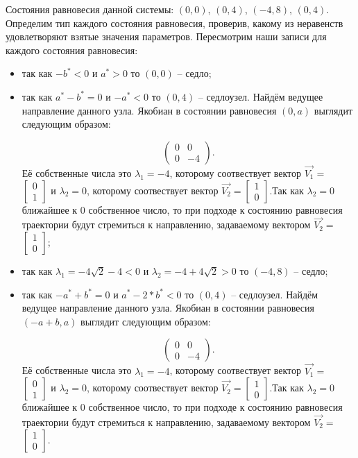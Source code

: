 Состояния равновесия данной системы: $(0, 0)$, $(0, 4)$, $(-4, 8)$, $(0, 4)$. Определим тип каждого состояния равновесия, проверив, какому из неравенств удовлетворяют взятые значения параметров.  Пересмотрим наши записи для каждого состояния равновесия: 
\begin{itemize}
	\item{ так как $-b^\ast  < 0 $ и $a^\ast > 0 $ то $(0, 0)$ -- седло;}
	\item{ так как $a^\ast - b^\ast = 0 $ и $-a^\ast  < 0 $ то $(0, 4)$ -- седлоузел. Найдём ведущее направление данного узла. Якобиан в состоянии равновесия $(0, a)$ выглядит следующим образом:
		
		$$\begin{pmatrix}0 & 0\\0 & -4\end{pmatrix}. $$Её собственные числа это $\lambda_1=-4$, которому соотвествует вектор $\Vec{V_1}=$ $\left[\begin{matrix}0\\1\end{matrix}\right]$ и $\lambda_2=0$, которому соотвествует вектор $\Vec{V_2}=$$\left[\begin{matrix}1\\0\end{matrix}\right]$.Так как $\lambda_2=0$ ближайшее к $0$ собственное число, то при подходе к состоянию равновесия траектории будут стремиться к направлению, задаваемому вектором $\Vec{V_2}=$ $\left[\begin{matrix}1\\0\end{matrix}\right]$;}
	\item{ так как ${\lambda_{1}} = - 4 \sqrt{2} - 4$$  < 0 $ и ${\lambda_{2}} = -4 + 4 \sqrt{2}$$ > 0 $ то $(-4, 8)$ -- седло;}
	\item{ так как $-a^\ast + b^\ast = 0 $ и $a^\ast - 2*b^\ast  < 0 $ то $(0, 4)$ -- седлоузел. Найдём ведущее направление данного узла. Якобиан в состоянии равновесия $(-a + b, a)$ выглядит следующим образом:
		
		$$\begin{pmatrix}0 & 0\\0 & -4\end{pmatrix}. $$Её собственные числа это $\lambda_1=-4$, которому соотвествует вектор $\Vec{V_1}=$ $\left[\begin{matrix}0\\1\end{matrix}\right]$ и $\lambda_2=0$, которому соотвествует вектор $\Vec{V_2}=$$\left[\begin{matrix}1\\0\end{matrix}\right]$.Так как $\lambda_2=0$ ближайшее к $0$ собственное число, то при подходе к состоянию равновесия траектории будут стремиться к направлению, задаваемому вектором $\Vec{V_2}=$ $\left[\begin{matrix}1\\0\end{matrix}\right]$.}
\end{itemize} 

